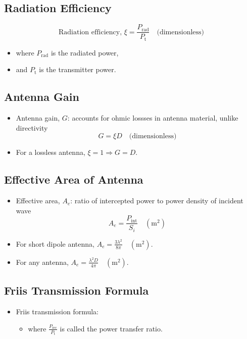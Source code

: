 \documentclass[a4paper]{article}
\begin{document}
\subsection{Radiation Efficiency}
$$\text{Radiation efficiency, }\xi = \frac{P_\text{rad}}{P_\text{t}}\quad\text{(dimensionless)}$$
\begin{itemize}
    \item where $P_\text{rad}$ is the radiated power,
    \item and $P_\text{t}$ is the transmitter power.
\end{itemize}

\subsection{Antenna Gain}
\begin{itemize}
    \item Antenna gain, $G$: accounts for ohmic lossses in antenna material, unlike directivity
    $$G = \xi D\quad\text{(dimensionless)}$$
    \item For a lossless antenna, $\xi = 1\Rightarrow G = D$.
\end{itemize}

\subsection{Effective Area of Antenna}
\begin{itemize}
    \item Effective area, $A_e$: ratio of intercepted power to power density of incident wave
    $$A_e = \frac{P_\text{int}}{S_i}\quad(\text{m}^2)$$
    \item For short dipole antenna, $A_e = \displaystyle\frac{3\lambda^2}{8\pi}\quad(\text{m}^2)$.
    \item For any antenna, $A_e = \displaystyle\frac{\lambda^2 D}{4\pi}\quad(\text{m}^2)$.
\end{itemize}

\subsection{Friis Transmission Formula}
\begin{itemize}
    \item Friis transmission formula:
    \begin{center}
    \end{center}
    \begin{itemize}[label = $\circ$]
        \item where $\displaystyle\frac{P_\text{rec}}{P_\text{t}}$ is called the power transfer ratio.
    \end{itemize}
\end{itemize}
\end{document}
